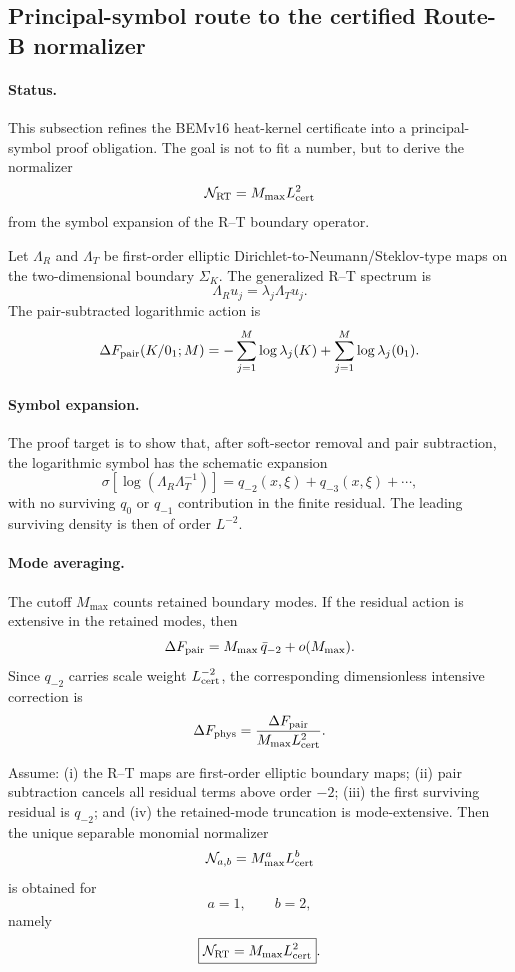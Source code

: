 
\subsection{Principal-symbol route to the certified Route-B normalizer}

\paragraph{Status.}
This subsection refines the BEMv16 heat-kernel certificate into a
principal-symbol proof obligation.  The goal is not to fit a number, but to
derive the normalizer
\[
\mathcal N_{\rm RT}=M_{\max}L_{\rm cert}^{2}
\]
from the symbol expansion of the R--T boundary operator.

Let \(\Lambda_R\) and \(\Lambda_T\) be first-order elliptic
Dirichlet-to-Neumann/Steklov-type maps on the two-dimensional boundary
\(\Sigma_K\).  The generalized R--T spectrum is
\[
\Lambda_R u_j=\lambda_j\Lambda_T u_j .
\]
The pair-subtracted logarithmic action is
\[
\Delta F_{\rm pair}(K/0_1;M)
=
-\sum_{j=1}^{M}\log \lambda_j(K)
+
\sum_{j=1}^{M}\log \lambda_j(0_1).
\]

\paragraph{Symbol expansion.}
The proof target is to show that, after soft-sector removal and pair
subtraction, the logarithmic symbol has the schematic expansion
\[
\sigma\!\left[\log(\Lambda_R\Lambda_T^{-1})\right]
=
q_{-2}(x,\xi)
+
q_{-3}(x,\xi)
+\cdots ,
\]
with no surviving \(q_0\) or \(q_{-1}\) contribution in the finite residual.
The leading surviving density is then of order \(L^{-2}\).

\paragraph{Mode averaging.}
The cutoff \(M_{\max}\) counts retained boundary modes.  If the residual
action is extensive in the retained modes, then
\[
\Delta F_{\rm pair}
=
M_{\max}\,\bar q_{-2}
+
o(M_{\max}).
\]
Since \(q_{-2}\) carries scale weight \(L_{\rm cert}^{-2}\), the corresponding
dimensionless intensive correction is
\[
\Delta F_{\rm phys}
=
\frac{\Delta F_{\rm pair}}
{M_{\max}L_{\rm cert}^{2}}.
\]

\begin{theorem}
Assume: (i) the R--T maps are first-order elliptic boundary maps; (ii) pair
subtraction cancels all residual terms above order \(-2\); (iii) the first
surviving residual is \(q_{-2}\); and (iv) the retained-mode truncation is
mode-extensive.  Then the unique separable monomial normalizer
\[
\mathcal N_{a,b}=M_{\max}^{a}L_{\rm cert}^{b}
\]
is obtained for
\[
a=1,\qquad b=2,
\]
namely
\[
\boxed{\mathcal N_{\rm RT}=M_{\max}L_{\rm cert}^{2}}.
\]
\end{theorem}

